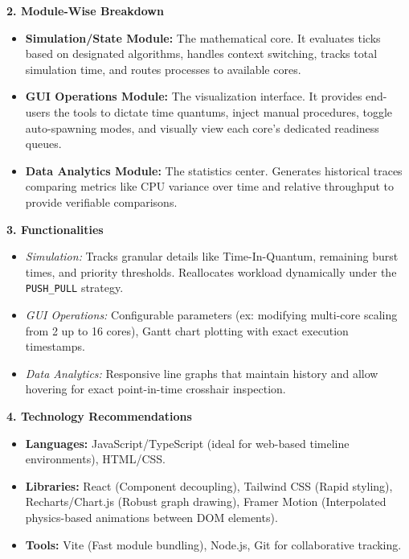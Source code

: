 \documentclass[a4paper]{article}
\begin{document}
\textbf{2. Module-Wise Breakdown}
\begin{itemize}[noitemsep]
    \item \textbf{Simulation/State Module:} The mathematical core. It evaluates ticks based on designated algorithms, handles context switching, tracks total simulation time, and routes processes to available cores.
    \item \textbf{GUI Operations Module:} The visualization interface. It provides end-users the tools to dictate time quantums, inject manual procedures, toggle auto-spawning modes, and visually view each core's dedicated readiness queues.
    \item \textbf{Data Analytics Module:} The statistics center. Generates historical traces comparing metrics like CPU variance over time and relative throughput to provide verifiable comparisons.
\end{itemize}

\textbf{3. Functionalities}
\begin{itemize}[noitemsep]
    \item \textit{Simulation:} Tracks granular details like Time-In-Quantum, remaining burst times, and priority thresholds. Reallocates workload dynamically under the \texttt{PUSH\_PULL} strategy.
    \item \textit{GUI Operations:} Configurable parameters (ex: modifying multi-core scaling from 2 up to 16 cores), Gantt chart plotting with exact execution timestamps.
    \item \textit{Data Analytics:} Responsive line graphs that maintain history and allow hovering for exact point-in-time crosshair inspection.
\end{itemize}

\textbf{4. Technology Recommendations}
\begin{itemize}[noitemsep]
    \item \textbf{Languages:} JavaScript/TypeScript (ideal for web-based timeline environments), HTML/CSS.
    \item \textbf{Libraries:} React (Component decoupling), Tailwind CSS (Rapid styling), Recharts/Chart.js (Robust graph drawing), Framer Motion (Interpolated physics-based animations between DOM elements).
    \item \textbf{Tools:} Vite (Fast module bundling), Node.js, Git for collaborative tracking.
\end{itemize}
\end{document}
